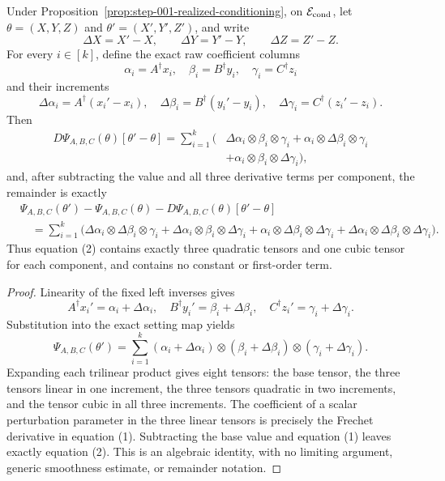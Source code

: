 \begin{lemma}
\label{lem:step-012-exact-expansion}
Under Proposition~\ref{prop:step-001-realized-conditioning}, on
\(\mathcal E_{\rm cond}\), let
\(\theta=(X,Y,Z)\) and \(\theta'=(X',Y',Z')\), and write
\[
  \Delta X=X'-X,\qquad \Delta Y=Y'-Y,\qquad \Delta Z=Z'-Z.
\]
For every \(i\in[k]\), define the exact raw coefficient columns
\[
  \alpha_i=A^\dagger x_i,\quad
  \beta_i=B^\dagger y_i,\quad
  \gamma_i=C^\dagger z_i
\]
and their increments
\[
  \Delta\alpha_i=A^\dagger(x_i'-x_i),\quad
  \Delta\beta_i=B^\dagger(y_i'-y_i),\quad
  \Delta\gamma_i=C^\dagger(z_i'-z_i).
\]
Then
\[
\begin{aligned}
  D\Psi_{A,B,C}(\theta)[\theta'-\theta]
  =\sum_{i=1}^k\bigl(&
      \Delta\alpha_i\otimes\beta_i\otimes\gamma_i
      +\alpha_i\otimes\Delta\beta_i\otimes\gamma_i\\
      &+\alpha_i\otimes\beta_i\otimes\Delta\gamma_i
    \bigr),
\end{aligned}\tag{1}
\]
and, after subtracting the value and all three derivative terms per
component, the remainder is exactly
\[
\begin{aligned}
  &\Psi_{A,B,C}(\theta')-\Psi_{A,B,C}(\theta)
       -D\Psi_{A,B,C}(\theta)[\theta'-\theta]\\
  &\quad=\sum_{i=1}^k\bigl(
      \Delta\alpha_i\otimes\Delta\beta_i\otimes\gamma_i
      +\Delta\alpha_i\otimes\beta_i\otimes\Delta\gamma_i
      +\alpha_i\otimes\Delta\beta_i\otimes\Delta\gamma_i
      +\Delta\alpha_i\otimes\Delta\beta_i\otimes
        \Delta\gamma_i
    \bigr).
\end{aligned}\tag{2}
\]
Thus equation (2) contains exactly three quadratic tensors and one cubic
tensor for each component, and contains no constant or first-order term.

\end{lemma}

\begin{proof}
Linearity of the fixed left inverses gives
\[
  A^\dagger x_i'=\alpha_i+\Delta\alpha_i,
  \quad B^\dagger y_i'=\beta_i+\Delta\beta_i,
  \quad C^\dagger z_i'=\gamma_i+\Delta\gamma_i.
\]
Substitution into the exact setting map yields
\[
  \Psi_{A,B,C}(\theta')
  =\sum_{i=1}^k
    (\alpha_i+\Delta\alpha_i)
    \otimes(\beta_i+\Delta\beta_i)
    \otimes(\gamma_i+\Delta\gamma_i).
\]
Expanding each trilinear product gives eight tensors: the base tensor, the
three tensors linear in one increment, the three tensors quadratic in two
increments, and the tensor cubic in all three increments. The coefficient
of a scalar perturbation parameter in the three linear tensors is precisely
the Frechet derivative in equation (1). Subtracting the base value and
equation (1) leaves exactly equation (2). This is an algebraic identity, with
no limiting argument, generic smoothness estimate, or remainder notation.


\end{proof}


